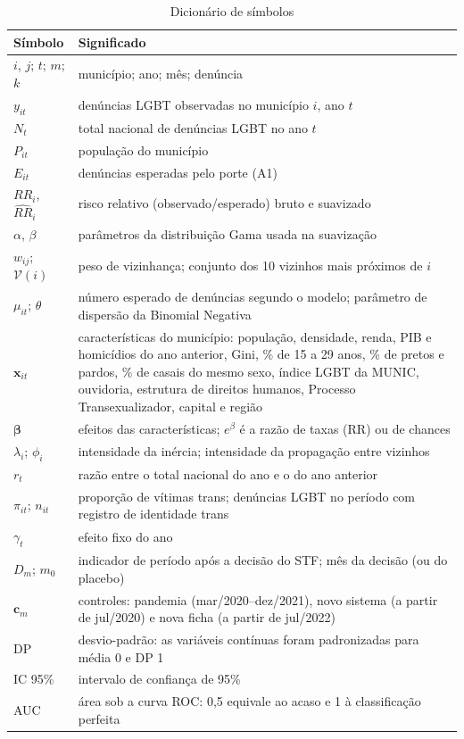 \documentclass[12pt]{article}
\begin{document}
\begin{table}[H]
\centering
\caption{Dicionário de símbolos}
\label{tab:dicionario}
{\renewcommand{\arraystretch}{1.2}\small
\begin{tabular}{p{2.6cm} p{10.6cm}}
\hline
\textbf{Símbolo} & \textbf{Significado} \\
\hline
$i$, $j$; $t$; $m$; $k$ & município; ano; mês; denúncia \\
$y_{it}$ & denúncias LGBT observadas no município $i$, ano $t$ \\
$N_t$ & total nacional de denúncias LGBT no ano $t$ \\
$P_{it}$ & população do município \\
$E_{it}$ & denúncias esperadas pelo porte (A1) \\
$RR_i$, $\widehat{RR}_i$ & risco relativo (observado/esperado) bruto e suavizado \\
$\alpha$, $\beta$ & parâmetros da distribuição Gama usada na suavização \\
$w_{ij}$; $\mathcal{V}(i)$ & peso de vizinhança; conjunto dos 10 vizinhos mais próximos de $i$ \\
$\mu_{it}$; $\theta$ & número esperado de denúncias segundo o modelo; parâmetro de dispersão da Binomial Negativa \\
$\mathbf{x}_{it}$ & características do município: população, densidade, renda, PIB e homicídios do ano anterior, Gini, \% de 15 a 29 anos, \% de pretos e pardos, \% de casais do mesmo sexo, índice LGBT da MUNIC, ouvidoria, estrutura de direitos humanos, Processo Transexualizador, capital e região \\
$\boldsymbol{\beta}$ & efeitos das características; $e^{\beta}$ é a razão de taxas (RR) ou de chances \\
$\lambda_i$; $\phi_i$ & intensidade da inércia; intensidade da propagação entre vizinhos \\
$r_t$ & razão entre o total nacional do ano e o do ano anterior \\
$\pi_{it}$; $n_{it}$ & proporção de vítimas trans; denúncias LGBT no período com registro de identidade trans \\
$\gamma_t$ & efeito fixo do ano \\
$D_m$; $m_0$ & indicador de período após a decisão do STF; mês da decisão (ou do placebo) \\
$\mathbf{c}_m$ & controles: pandemia (mar/2020--dez/2021), novo sistema (a partir de jul/2020) e nova ficha (a partir de jul/2022) \\
DP & desvio-padrão: as variáveis contínuas foram padronizadas para média 0 e DP 1 \\
IC 95\% & intervalo de confiança de 95\% \\
AUC & área sob a curva ROC: 0,5 equivale ao acaso e 1 à classificação perfeita \\
\hline
\end{tabular}}
\end{table}




\end{document}
